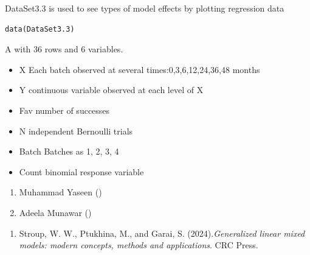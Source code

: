 \documentclass[a4paper]{book}
\begin{document}
%
\begin{Description}
DataSet3.3 is used to see types of model effects by plotting regression data
\end{Description}
%
\begin{Usage}
\begin{verbatim}
data(DataSet3.3)
\end{verbatim}
\end{Usage}
%
\begin{Format}
A  with 36 rows and 6 variables.
\end{Format}
%
\begin{Details}
\begin{itemize}

\item{} X     Each batch observed at several times:0,3,6,12,24,36,48 months
\item{} Y     continuous variable observed at each level of X
\item{} Fav   number of successes
\item{} N     independent Bernoulli trials
\item{} Batch Batches as 1, 2, 3, 4
\item{} Count binomial response variable

\end{itemize}

\end{Details}
%
\begin{Author}
\begin{enumerate}

\item{}  Muhammad Yaseen ()
\item{} Adeela Munawar ()

\end{enumerate}

\end{Author}
%
\begin{References}
\begin{enumerate}

\item{} Stroup, W. W., Ptukhina, M., and Garai, S. (2024).\emph{Generalized linear mixed models: modern concepts, methods and applications}.
CRC Press.

\end{enumerate}

\end{References}
\end{document}
